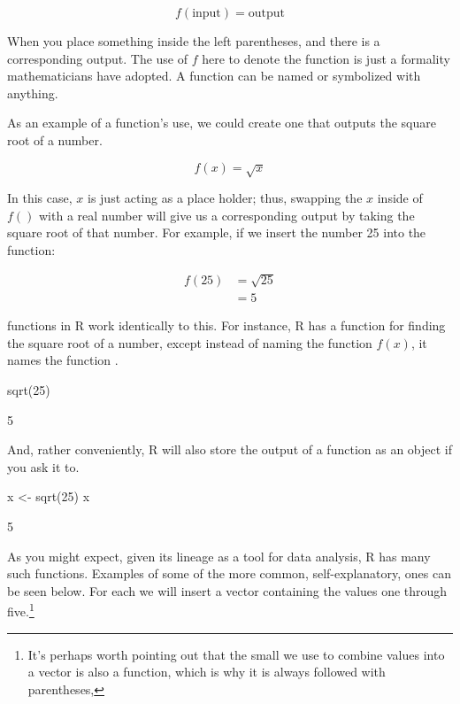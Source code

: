 \begin{equation} %
f(\text{input}) = \text{output}
\end{equation}

\noindent
When you place something inside the left parentheses, and there is a corresponding output. The use of $f$ here to denote the function is just a formality mathematicians have adopted.  A function can be named or symbolized with anything.  

As an example of a function's use, we could create one that outputs the square root of a number.

\begin{equation}
f(x) = \sqrt{x}
\end{equation}

\noindent
In this case, $x$ is just acting as a place holder; thus, swapping the $x$ inside of $f()$ with a real number will give us a corresponding output by taking the square root of that number. For example, if we insert the number 25 into the function:

\begin{equation}
\begin{split}
f(25) &= \sqrt{25} \\
&= 5
\end{split}
\end{equation}

\noindent
\Glspl{function} in R work identically to this.  For instance, R has a function for finding the square root of a number, except instead of naming the function $f(x)$, it names the function .  

\begin{inR}
sqrt(25)
\end{inR}
\begin{outR}
[1] 5
\end{outR}

\noindent
And, rather conveniently, R will also store the output of a function as an object if you ask it to.
\begin{inR}
x <- sqrt(25)
x
\end{inR}
\begin{outR}
[1] 5
\end{outR}


As you might expect, given its lineage as a tool for data analysis, R has many such functions.  Examples of some of the more common, self-explanatory, ones can be seen below. For each we will insert a vector containing the values one through five.\footnote{It's perhaps worth pointing out that the small  we use to combine values into a vector is also a function, which is why it is always followed with parentheses, }

